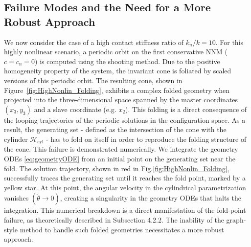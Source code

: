 \documentclass[a4paper,9pt,parskip=half,english]{article}
\theoremstyle{plain}
\theoremstyle{definition}
\begin{document}
\subsection{Failure Modes and the Need for a More Robust Approach}
We now consider the case of a high contact stiffness ratio of $k_n/k=10$. For this highly nonlinear scenario, a periodic orbit on the first conservative NNM ($c=c_n=0$) is computed using the shooting method. Due to the positive homogeneity property of the system, the invariant cone is foliated by scaled versions of this periodic orbit. 
The resulting cone, shown in Figure~\ref{fig:HighNonlin_Folding}, exhibits a complex folded geometry when projected into the three-dimensional space spanned by the master coordinates $(x_3,y_3)$ and a slave coordinate (e.g. $x_2$). This folding is a direct consequence of the looping trajectories of the periodic solutions in the configuration space. As a result, the generating set - defined as the intersection of the cone with the cylinder $\mathcal{H}_{\textrm{cyl}}$ - has to fold on itself in order to reproduce the folding structure of the cone. This failure is demonstrated numerically. We integrate the geometry ODEs \eqref{eq:geometryODE} from an initial point on the generating set near the fold. The solution trajectory, shown in red in Fig.\ref{fig:HighNonlin_Folding}, successfully traces the generating set until it reaches the fold point, marked by a yellow star. At this point, the angular velocity in the cylindrical parametrization vanishes $(\dot{\theta} \rightarrow 0)$, creating a singularity in the geometry ODEs that halts the integration. This numerical breakdown is a direct manifestation of the fold-point failure, as theoretically described in Subsection 4.2.2. The inability of the graph-style method to handle such folded geometries necessitates a more robust approach.
\end{document}
